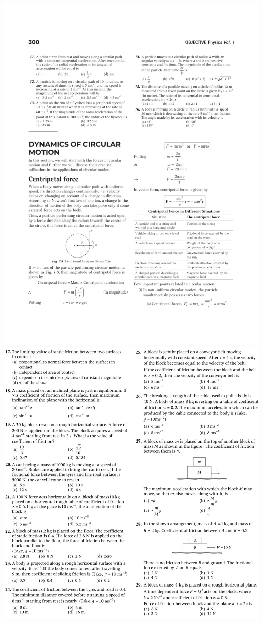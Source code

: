 \documentclass{article}
\begin{document}
\includegraphics[trim={0 0 0 0},clip, width=170 mm]{11-16}
\linebreak
\includegraphics[trim={0 0 0 0},clip, width=170 mm]{17-29.png}
\end{document}
